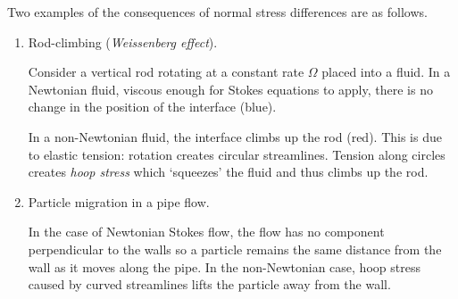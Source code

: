 \documentclass{jknotes}
\begin{document}
\begin{eg}
	Two examples of the consequences of normal stress differences are as
	follows.
	\begin{enumerate}
		\item Rod-climbing (\emph{Weissenberg effect}).
			\begin{center}
			\end{center}
			Consider a vertical rod rotating at a constant rate $\Omega$
			placed into a fluid. In a Newtonian fluid, viscous enough for
			Stokes equations to apply, there is no change in the position of
			the interface (blue).

			In a non-Newtonian fluid, the interface climbs up the rod (red).
			This is due to elastic tension: rotation creates circular
			streamlines. Tension along circles creates \emph{hoop stress}
			which `squeezes' the fluid and thus climbs up the rod.

		\item  Particle migration in a pipe flow.
			\begin{center}
			\end{center}
			In the case of Newtonian Stokes flow, the flow has no component
			perpendicular to the walls so a particle remains the same distance
			from the wall as it moves along the pipe. In the non-Newtonian
			case, hoop stress caused by curved streamlines lifts the particle
			away from the wall.
	\end{enumerate}
\end{eg}
\end{document}
